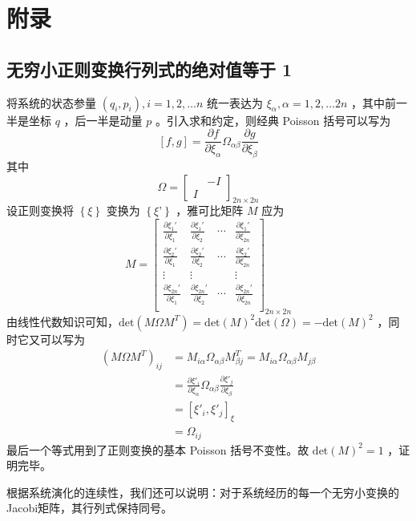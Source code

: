    
\chapter{附录}
\section{无穷小正则变换行列式的绝对值等于 1}
将系统的状态参量 $(q_i,p_i), i = 1,2,\dots n$ 统一表达为 $\xi_\alpha, \alpha = 1,2,\dots 2n$ ，其中前一半是坐标 $q$ ，后一半是动量 $p$ 。引入求和约定，则经典 Poisson 括号可以写为
\[
    [f, g] = \frac{\partial f}{\partial \xi_\alpha}\Omega_{\alpha\beta}\frac{\partial g}{\partial \xi_\beta}
\]
其中
\[
    \Omega = \begin{bmatrix}
        & -I\\
        I&
    \end{bmatrix}_{2n\times 2n}
\]
设正则变换将 $\left \{ \xi \right \}$ 变换为 $\left \{ \xi’ \right \}$ ，雅可比矩阵 $M$ 应为
\[
    M = \begin{bmatrix}
        \frac{\partial \xi_1'}{\partial \xi_1} & \frac{\partial \xi_1'}{\partial \xi_2} & \cdots  & \frac{\partial \xi_1'}{\partial \xi_{2n}} \\
        \frac{\partial \xi_2'}{\partial \xi_1} & \frac{\partial \xi_2'}{\partial \xi_2} & \cdots  & \frac{\partial \xi_2'}{\partial \xi_{2n}} \\
        \vdots & \vdots &  & \vdots\\
        \frac{\partial \xi_{2n}'}{\partial \xi_1} & \frac{\partial \xi_{2n}'}{\partial \xi_2} & \cdots  & \frac{\partial \xi_{2n}'}{\partial \xi_{2n}} \\
    \end{bmatrix}_{2n\times 2n}
\]
由线性代数知识可知，$\text{det}(M\Omega M^T) = \text{det}(M)^2 \text{det}(\Omega) = - \text{det}(M)^2$ ，同时它又可以写为
\begin{align*}
    (M\Omega M^T)_{ij} &= M_{i\alpha}\Omega_{\alpha\beta}M^T_{\beta j}
    = M_{i\alpha}\Omega_{\alpha\beta}M_{j\beta}\\
    &= \frac{\partial \xi'_i}{\partial \xi_\alpha}\Omega_{\alpha\beta}\frac{\partial \xi'_j}{\partial \xi_\beta}\\
    &= [\xi'_i, \xi'_j]_\xi\\
    &= \Omega_{ij}
\end{align*}
最后一个等式用到了正则变换的基本 Poisson 括号不变性。故 $\text{det}(M)^2 = 1$ ，证明完毕。

根据系统演化的连续性，我们还可以说明：对于系统经历的每一个无穷小变换的Jacobi矩阵，其行列式保持同号。